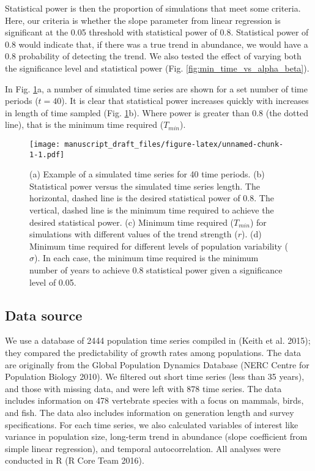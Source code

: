 \documentclass[12pt,]{article}
\begin{document}
Statistical power is then the proportion of simulations that meet some
criteria. Here, our criteria is whether the slope parameter from linear
regression is significant at the 0.05 threshold with statistical power
of 0.8. Statistical power of 0.8 would indicate that, if there was a
true trend in abundance, we would have a 0.8 probability of detecting
the trend. We also tested the effect of varying both the significance
level and statistical power (Fig. \ref{fig:min_time_vs_alpha_beta}).

In Fig. \ref{fig:theoretical_approach}a, a number of simulated time
series are shown for a set number of time periods (\(t=40\)). It is
clear that statistical power increases quickly with increases in length
of time sampled (Fig. \ref{fig:theoretical_approach}b). Where power is
greater than 0.8 (the dotted line), that is the minimum time required
(\(T_{min}\)).

\begin{figure}[htbp]
\centering
\texttt{[image: manuscript\_draft\_files/figure-latex/unnamed-chunk-1-1.pdf]}
\caption{(a) Example of a simulated time series for 40 time periods. (b)
Statistical power versus the simulated time series length. The
horizontal, dashed line is the desired statistical power of 0.8. The
vertical, dashed line is the minimum time required to achieve the
desired statistical power. (c) Minimum time required (\(T_{min}\)) for
simulations with different values of the trend strength (\(r\)). (d)
Minimum time required for different levels of population variability
(\(\sigma\)). In each case, the minimum time required is the minimum
number of years to achieve 0.8 statistical power given a significance
level of 0.05.\label{fig:theoretical_approach}}
\end{figure}

\subsection{Data source}\label{data-source}

We use a database of 2444 population time series compiled in (Keith et
al. 2015); they compared the predictability of growth rates among
populations. The data are originally from the Global Population Dynamics
Database (NERC Centre for Population Biology 2010). We filtered out
short time series (less than 35 years), and those with missing data, and
were left with 878 time series. The data includes information on 478
vertebrate species with a focus on mammals, birds, and fish. The data
also includes information on generation length and survey
specifications. For each time series, we also calculated variables of
interest like variance in population size, long-term trend in abundance
(slope coefficient from simple linear regression), and temporal
autocorrelation. All analyses were conducted in R (R Core Team 2016).
\end{document}
